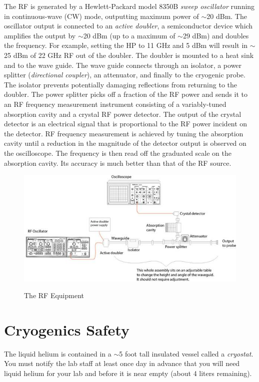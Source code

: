 \documentclass{../lab}
\begin{document}
The RF is generated by a Hewlett-Packard model 8350B \emph{sweep oscillator} running in continuous-wave (CW) mode, outputting maximum power of $\sim$20 dBm. The oscillator output is connected to an \emph{active doubler}, a semiconductor device which amplifies the output by $\sim$20 dBm (up to a maximum of $\sim$29 dBm) and doubles the frequency. For example, setting the HP to 11 GHz and 5 dBm will result in $\sim$25 dBm of 22 GHz RF out of the doubler. The doubler is mounted to a heat sink and to the wave guide. The wave guide connects through an isolator, a power splitter (\emph{directional coupler}), an attenuator, and finally to the cryogenic probe. The isolator prevents potentially damaging reflections from returning to the doubler. The power splitter picks off a fraction of the RF power and sends it to an RF frequency measurement instrument consisting of a variably-tuned absorption cavity and a crystal RF power detector. The output of the crystal detector is an electrical signal that is proportional to the RF power incident on the detector. RF frequency measurement is achieved by tuning the absorption cavity until a reduction in the magnitude of the detector output is observed on the oscilloscope. The frequency is then read off the graduated scale on the absorption cavity. Its accuracy is much better than that of the RF source.

\begin{figure}[h]
    \centering
    \href{http://experimentationlab.berkeley.edu/sites/default/files/images/JOS9.jpg}{\includegraphics[width=0.7\linewidth]{images/JOS9.jpg}}
    \caption{The RF Equipment}
    \label{fig:RFEquipment}
\end{figure}

\section{Cryogenics Safety}

The liquid helium is contained in a $\sim$5 foot tall insulated vessel called a \emph{cryostat}. You must notify the lab staff at least once day in advance that you will need liquid helium for your lab and before it is near empty (about 4 liters remaining).
\end{document}
